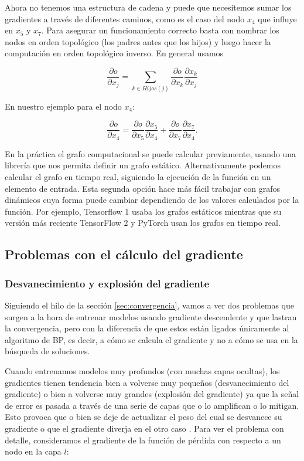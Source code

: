 Ahora no tenemos una estructura de cadena y puede que necesitemos sumar los gradientes a través de diferentes caminos, como es el caso del nodo $x_4$ que influye en $x_5$ y $x_7$. Para asegurar un funcionamiento correcto basta con nombrar los nodos en orden topológico (los padres antes que los hijos) y luego hacer la computación en orden topológico inverso. En general usamos

$$ \frac{\partial o }{ \partial x_j } = \sum_{k \in Hijos(j)} \frac{\partial o}{ \partial x_k} \frac{\partial x_k}{\partial x_j} $$

En nuestro ejemplo para el nodo $x_4$:

$$   \frac{\partial o }{ \partial x_4 }  =  \frac{\partial o}{ \partial x_5} \frac{\partial x_5}{\partial x_4} +\frac{\partial o}{ \partial x_7} \frac{\partial x_7}{\partial x_4} .$$


En la práctica el grafo computacional se puede calcular previamente, usando una librería que nos permita definir un grafo estático. Alternativamente podemos calcular el grafo en tiempo real, siguiendo la ejecución de la función en un elemento de entrada. Esta segunda opción hace más fácil trabajar con grafos dinámicos cuya forma puede cambiar dependiendo de los valores calculados por la función. Por ejemplo, Tensorflow 1 usaba los grafos estáticos mientras que su versión más reciente TensorFlow 2 y PyTorch usan los grafos en tiempo real. 




\subsection{Problemas con el cálculo del gradiente}

\subsubsection{Desvanecimiento y explosión del gradiente}\label{sec:desvyexpl}


Siguiendo el hilo de la sección \ref{sec:convergencia}, vamos a ver dos problemas que surgen a la hora de entrenar modelos usando gradiente descendente y que lastran la convergencia, pero con la diferencia de que estos están ligados únicamente al algoritmo de BP, es decir, a cómo se calcula el gradiente y no a cómo se usa en la búsqueda de soluciones.

Cuando entrenamos modelos muy profundos (con muchas capas ocultas), los gradientes tienen tendencia bien a volverse muy pequeños (desvanecimiento del gradiente) o bien a volverse muy grandes (explosión del gradiente) ya que la señal de error es pasada a través de una serie de capas que o lo amplifican o lo mitigan. Esto provoca que o bien se deje de actualizar el peso del cual se desvanece su gradiente o que el gradiente diverja en el otro caso \cite{VanishExplode}. Para ver el problema con detalle, consideramos el gradiente de la función de pérdida con respecto a un nodo en la capa $l$:

